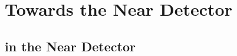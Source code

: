 \chapter{Towards the \dune{} Near Detector}
\label{chap:dune-nd}


\section{\AC{} in the \dune{} Near Detector}
\label{sec:dune-nd_ac}

\afterpage{\clearpage}